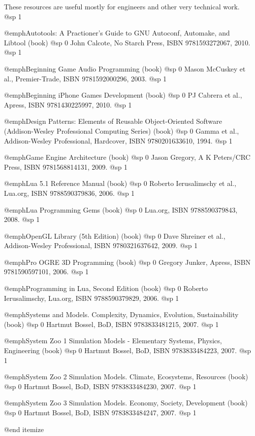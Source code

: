These resources are useful mostly for engineers and other very technical work.
@sp 1
\itemize

\item
@emph{Autotools: A Practioner's Guide to GNU Autoconf, Automake, and Libtool} (book)
@sp 0
John Calcote, No Starch Press, ISBN 9781593272067, 2010.
@sp 1

\item
@emph{Beginning Game Audio Programming} (book)
@sp 0
Mason McCuskey et al., Premier-Trade, ISBN 9781592000296, 2003.
@sp 1

\item
@emph{Beginning iPhone Games Development} (book)
@sp 0
PJ Cabrera et al., Apress, ISBN 9781430225997, 2010.
@sp 1

\item
@emph{Design Patterns: Elements of Reusable Object-Oriented Software (Addison-Wesley Professional Computing Series)} (book)
@sp 0
Gamma et al., Addison-Wesley Professional, Hardcover, ISBN 9780201633610, 1994.
@sp 1

\item
@emph{Game Engine Architecture} (book)
@sp 0
Jason Gregory, A K Peters/CRC Press, ISBN 9781568814131, 2009.
@sp 1

\item
@emph{Lua 5.1 Reference Manual} (book)
@sp 0
Roberto Ierusalimschy et al., Lua.org, ISBN 9788590379836, 2006.
@sp 1

\item
@emph{Lua Programming Gems} (book)
@sp 0
Lua.org, ISBN 9788590379843, 2008.
@sp 1

\item
@emph{OpenGL Library (5th Edition)} (book)
@sp 0
Dave Shreiner et al., Addison-Wesley Professional, ISBN 9780321637642, 2009.
@sp 1

\item
@emph{Pro OGRE 3D Programming} (book)
@sp 0
Gregory Junker, Apress, ISBN 9781590597101, 2006.
@sp 1

\item
@emph{Programming in Lua, Second Edition} (book)
@sp 0
Roberto Ierusalimschy, Lua.org, ISBN 9788590379829, 2006.
@sp 1

\item
@emph{Systems and Models. Complexity, Dynamics, Evolution, Sustainability} (book)
@sp 0
Hartmut Bossel, BoD, ISBN 9783833481215, 2007.
@sp 1

\item
@emph{System Zoo 1 Simulation Models - Elementary Systems, Physics, Engineering} (book)
@sp 0
Hartmut Bossel, BoD, ISBN 9783833484223, 2007.
@sp 1

\item
@emph{System Zoo 2 Simulation Models. Climate, Ecosystems, Resources} (book)
@sp 0
Hartmut Bossel, BoD, ISBN 9783833484230, 2007.
@sp 1

\item
@emph{System Zoo 3 Simulation Models. Economy, Society, Development} (book)
@sp 0
Hartmut Bossel, BoD, ISBN 9783833484247, 2007.
@sp 1

@end itemize

